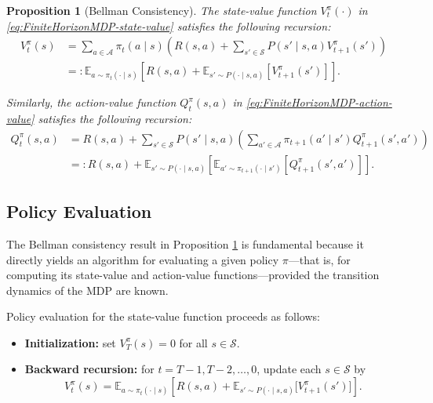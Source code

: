 \documentclass[
]{book}
\providecommand{\tightlist}{%
  \setlength{\itemsep}{0pt}\setlength{\parskip}{0pt}}
\newtheorem{proposition}{Proposition}[chapter]
\theoremstyle{definition}
\theoremstyle{definition}
\theoremstyle{definition}
\theoremstyle{definition}
\theoremstyle{remark}
\begin{document}
\begin{proposition}[Bellman Consistency]
\protect\hypertarget{prp:BellmanConsistency}{}\label{prp:BellmanConsistency}The state-value function \(V^{\pi}_t(\cdot)\) in \eqref{eq:FiniteHorizonMDP-state-value} satisfies the following recursion:
\begin{equation}
\begin{split}
V^{\pi}_t(s) & = \sum_{a \in \mathcal{A}} \pi_t(a\mid s) \left( R(s,a) + \sum_{s' \in \mathcal{S}} P(s' \mid s, a) V^{\pi}_{t+1} (s') \right) \\
    & =: \mathbb{E}_{a \sim \pi_t(\cdot \mid s)} \left[ R(s, a) + \mathbb{E}_{s' \sim P(\cdot \mid s, a)} [V^{\pi}_{t+1}(s')] \right].
\end{split}
\label{eq:BellmanConsistency-State-Value}
\end{equation}

Similarly, the action-value function \(Q^{\pi}_t(s,a)\) in \eqref{eq:FiniteHorizonMDP-action-value} satisfies the following recursion:
\begin{equation}
\begin{split}
Q^{\pi}_t (s, a) & = R(s,a) + \sum_{s' \in \mathcal{S}} P(s' \mid s, a) \left( \sum_{a' \in \mathcal{A}} \pi_{t+1}(a' \mid s') Q^{\pi}_{t+1}(s', a')\right) \\
& =: R(s, a) + \mathbb{E}_{s' \sim P(\cdot \mid s, a)} \left[\mathbb{E}_{a' \sim \pi_{t+1}(\cdot \mid s')} [Q^{\pi}_{t+1}(s', a')] \right].
\end{split}
\label{eq:BellmanConsistency-Action-Value}
\end{equation}
\end{proposition}

\subsection{Policy Evaluation}\label{policy-evaluation}

The Bellman consistency result in Proposition \ref{prp:BellmanConsistency} is fundamental because it directly yields an algorithm for evaluating a given policy \(\pi\)---that is, for computing its state-value and action-value functions---provided the transition dynamics of the MDP are known.

Policy evaluation for the state-value function proceeds as follows:

\begin{itemize}
\tightlist
\item
  \textbf{Initialization:} set \(V^{\pi}_T(s) = 0\) for all \(s \in \mathcal{S}\).\\
\item
  \textbf{Backward recursion:} for \(t = T-1, T-2, \dots, 0\), update each \(s \in \mathcal{S}\) by
  \[
  V^{\pi}_{t}(s) = \mathbb{E}_{a \sim \pi_t(\cdot \mid s)} \left[ R(s, a) + \mathbb{E}_{s' \sim P(\cdot \mid s, a)} \big[ V^{\pi}_{t+1}(s') \big] \right].
  \]
\end{itemize}
\end{document}

